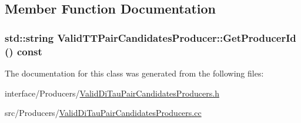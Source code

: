 \subsection{Member Function Documentation}
\hypertarget{classValidTTPairCandidatesProducer_ada2da9b284f291b868756ad5ab194daf}{
\subsubsection[{GetProducerId}]{\setlength{\rightskip}{0pt plus 5cm}std::string ValidTTPairCandidatesProducer::GetProducerId () const}}
\label{classValidTTPairCandidatesProducer_ada2da9b284f291b868756ad5ab194daf}


The documentation for this class was generated from the following files:\begin{DoxyCompactItemize}
\item 
interface/Producers/\hyperlink{ValidDiTauPairCandidatesProducers_8h}{ValidDiTauPairCandidatesProducers.h}\item 
src/Producers/\hyperlink{ValidDiTauPairCandidatesProducers_8cc}{ValidDiTauPairCandidatesProducers.cc}\end{DoxyCompactItemize}
